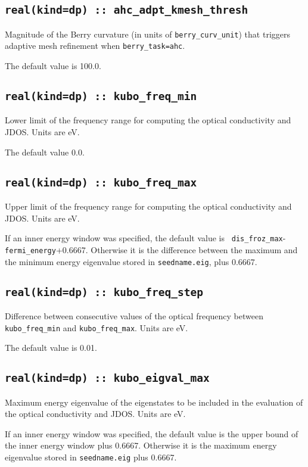 \subsection[berry\_adpt\_kmesh\_thresh]{\tt real(kind=dp) ::
  ahc\_adpt\_kmesh\_thresh}

Magnitude of the Berry curvature (in units of {\tt berry\_curv\_unit})
that triggers adaptive mesh refinement when {\tt berry\_task=ahc}.

The default value is 100.0.


\subsection[optics\_energy\_min]{\tt real(kind=dp) :: kubo\_freq\_min}
Lower limit of the frequency range for computing the optical conductivity
and JDOS. Units are eV.

The default value 0.0.

\subsection[optics\_energy\_max]{\tt real(kind=dp) :: kubo\_freq\_max}
Upper limit of the frequency range for computing the optical conductivity
and JDOS. Units are eV.

If an inner energy window was specified, the default value is {\tt
  dis\_froz\_max}-{\tt fermi\_energy}+0.6667.  Otherwise it is the
difference between the maximum and the minimum energy eigenvalue
stored in {\tt seedname.eig}, plus 0.6667.


\subsection[optics\_energy\_step]{\tt real(kind=dp) :: kubo\_freq\_step}
Difference between consecutive values of the optical frequency
between {\tt kubo\_freq\_min} and {\tt kubo\_freq\_max}. Units are eV.

The default value is 0.01.


\subsection[optics\_energy\_max]{\tt real(kind=dp) ::
  kubo\_eigval\_max}
Maximum energy eigenvalue of the eigenstates to be included in the
evaluation of the optical conductivity and JDOS.  Units are eV.

If an inner energy window was specified, the default value is the
upper bound of the inner energy window plus 0.6667.  Otherwise it is
the maximum energy eigenvalue stored in {\tt seedname.eig} plus
0.6667.

